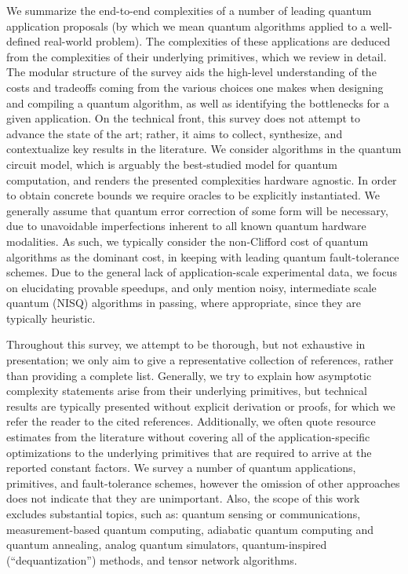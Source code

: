 \documentclass[a4paper,11pt,notitlepage]{report}
\begin{document}
We summarize the end-to-end complexities of a number of leading quantum application proposals (by which we mean quantum algorithms applied to a well-defined real-world problem). The complexities of these applications are deduced from the complexities of their underlying primitives, which we review in detail. 
The modular structure of the survey aids the high-level understanding of the costs and tradeoffs coming from the various choices one makes when designing and compiling a quantum algorithm, as well as identifying the bottlenecks for a given application. On the technical front, this survey does not attempt to advance the state of the art; rather, it aims to collect, synthesize, and contextualize key results in the literature.
We consider algorithms in the quantum circuit model, which is arguably the best-studied model for quantum computation, and renders the presented complexities hardware agnostic. In order to obtain concrete bounds we require oracles to be explicitly instantiated. We generally assume that quantum error correction of some form will be necessary, due to unavoidable imperfections inherent to all known quantum hardware modalities. As such, we typically consider the non-Clifford cost of quantum algorithms as the dominant cost, in keeping with leading quantum fault-tolerance schemes. Due to the general lack of application-scale experimental data, we focus on elucidating provable speedups, and only mention noisy, intermediate scale quantum (NISQ) algorithms in passing, where appropriate, since they are typically heuristic.

Throughout this survey, we attempt to be thorough, but not exhaustive in presentation; 
we only aim to give a representative collection of references, rather than providing a complete list. Generally, we try to explain how asymptotic complexity statements arise from their underlying primitives, but technical results are typically presented without explicit derivation or proofs, for which we refer the reader to the cited references. Additionally, we often quote resource estimates from the literature without covering all of the application-specific optimizations to the underlying primitives that are required to arrive at the reported constant factors. We survey a number of quantum applications, primitives, and fault-tolerance schemes, however the omission of other approaches does not indicate that they are unimportant. Also, the scope of this work excludes substantial topics, such as: quantum sensing or communications, measurement-based quantum computing, adiabatic quantum computing and quantum annealing, analog quantum simulators, quantum-inspired (``dequantization'') methods, and tensor network algorithms. 
\end{document}
